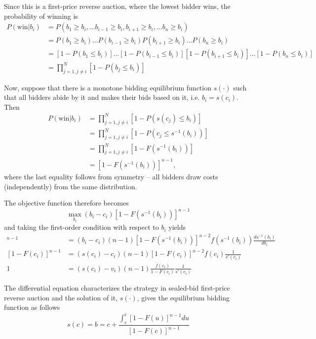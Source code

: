 \documentclass[11pt]{article}
\begin{document}
Since this is a first-price reverse auction, where the lowest bidder wins, 
the probability of winning is 
\begin{align*}
    P(\text{win}|b_i) &= P(b_1 \geq b_i, ... b_{i-1} \geq b_i, b_{i+1} \geq b_i, ... b_n \geq b_i) \\
        &= P(b_1 \geq b_i) ... P(b_{i-1} \geq b_i) P(b_{i+1} \geq b_i) ... P(b_n \geq b_i) \\
        &= [1-P(b_1 \leq b_i)] ... [1-P(b_{i-1} \leq b_i)][1-P(b_{i+1} \leq b_i)] ... [1-P(b_n \leq b_i)] \\
        &= \prod_{j=1, j \neq i}^{N}[1-P(b_j \leq b_i)]
\end{align*}

Now, suppose that there is a monotone bidding equilibrium function $s(\cdot)$ such that 
all bidders abide by it and makes their bids based on it, i.e. $b_i = s(c_i)$. 
Then
\begin{align*}
    P(\text{win}|b_i) &= \prod_{j=1, j \neq i}^{N}[1-P(s(c_j) \leq b_i)] \\ 
        &= \prod_{j=1, j \neq i}^{N}[1-P(c_j \leq s^{-1}(b_i))] \\ 
        &= \prod_{j=1, j \neq i}^{N}[1-F(s^{-1}(b_i))] \\ 
        &= [1-F(s^{-1}(b_i))]^{n-1}, 
\end{align*}
where the last equality follows from symmetry -- all bidders draw costs (independently) 
from the same distribution. 

The objective function therefore becomes 
$$ \max_{b_i} (b_i - c_i)[1-F(s^{-1}(b_i))]^{n-1}$$ 
and taking the first-order condition with respect to $b_i$ yields
\begin{align}
    [1-F(s^{-1}(b_i))]^{n-1} &= (b_i -c_i)(n-1)[1-F(s^{-1}(b_i))]^{n-2}f(s^{-1}(b_i))\frac{d s^{-1}(b_i)}{d b_i} \nonumber \\
    [1-F(c_i)]^{n-1} &= (s(c_i) -c_i)(n-1)[1-F(c_i)]^{n-2}f(c_i)\frac{1}{s'(c_i)} \nonumber \\
    1 &= (s(c_i)-v_i)(n-1)\frac{f(c_i)}{1-F(c_i)}\frac{1}{s'(c_i)}     \label{eqn:BiddingDiffQ}
\end{align}

The differential equation characterizes the strategy in sealed-bid first-price 
reverse auction and the solution of it, $s(\cdot)$, gives the equilibrium 
bidding function as follows \cite{HubbardPaarsch2009}
\begin{equation}
    s(c) = b =  c + \frac{\int_c^{\overline{c}} [1 - F(u)]^{n-1} du}{[1 - F(c)]^{n-1}}
    \label{eqn:BiddingFunction}
\end{equation}
\end{document}
